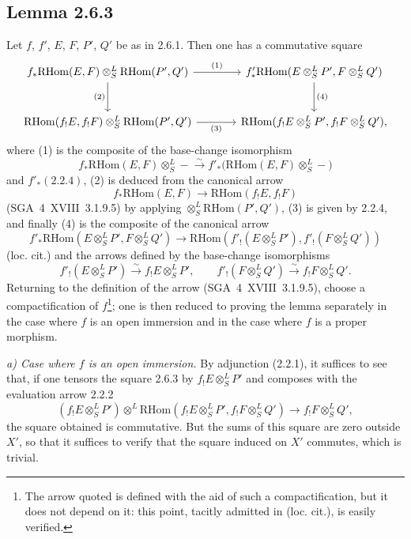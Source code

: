 \documentclass[11pt]{article}
\providecommand{\RHom}{\mathrm{RHom}}
\providecommand{\RHom}{\mathrm{RHom}}
\providecommand{\RHom}{\mathrm R\mathcal{H}om}
\begin{document}
\subsection*{Lemma 2.6.3}
Let $f$, $f'$, $E$, $F$, $P'$, $Q'$ be as in 2.6.1. Then one has a commutative square
\[
\begin{tikzcd}[column sep=large,row sep=large]
f_*\RHom(E,F)\otimes^L_S\RHom(P',Q') \arrow[r,"(1)"] \arrow[d,"(2)"'] & f'_*\RHom(E\otimes^L_SP',F\otimes^L_SQ') \arrow[d,"(4)"]\\
\RHom(f_!E,f_!F)\otimes^L_S\RHom(P',Q') \arrow[r,"(3)"'] & \RHom(f_!E\otimes^L_SP',f_!F\otimes^L_SQ'),
\end{tikzcd}
\]
where (1) is the composite of the base-change isomorphism
\[
f_*\RHom(E,F)\otimes^L_S -\xrightarrow{\sim}f'_*\bigl(\RHom(E,F)\otimes^L_S-\bigr)
\]
and $f'_*(2.2.4)$, (2) is deduced from the canonical arrow
\[
f_*\RHom(E,F)\longrightarrow\RHom(f_!E,f_!F)
\]
(SGA~4~XVIII~3.1.9.5) by applying $\otimes^L_S\RHom(P',Q')$, (3) is given by 2.2.4, and finally (4) is the composite of the canonical arrow
\[
f'_*\RHom(E\otimes^L_SP',F\otimes^L_SQ')
\longrightarrow
\RHom(f'_!(E\otimes^L_SP'),f'_!(F\otimes^L_SQ'))
\]
(loc. cit.) and the arrows defined by the base-change isomorphisms
\[
f'_!(E\otimes^L_SP')\xrightarrow{\sim}f_!E\otimes^L_SP',
\qquad
f'_!(F\otimes^L_SQ')\xrightarrow{\sim}f_!F\otimes^L_SQ'.
\]
Returning to the definition of the arrow (SGA~4~XVIII~3.1.9.5), choose a compactification of $f$\footnote{The arrow quoted is defined with the aid of such a compactification, but it does not depend on it: this point, tacitly admitted in (loc. cit.), is easily verified.}; one is then reduced to proving the lemma separately in the case where $f$ is an open immersion and in the case where $f$ is a proper morphism.

\emph{a) Case where $f$ is an open immersion.} By adjunction (2.2.1), it suffices to see that, if one tensors the square 2.6.3 by $f_!E\otimes^L_SP'$ and composes with the evaluation arrow 2.2.2
\[
(f_!E\otimes^L_SP')\otimes^L\RHom(f_!E\otimes^L_SP',f_!F\otimes^L_SQ')\longrightarrow f_!F\otimes^L_SQ',
\]
the square obtained is commutative. But the sums of this square are zero outside $X'$, so that it suffices to verify that the square induced on $X'$ commutes, which is trivial.
\end{document}
